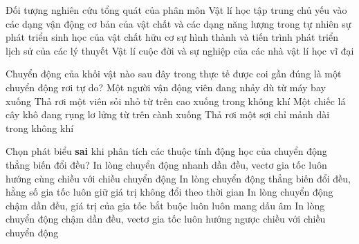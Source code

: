 	\begin{ex}%
		Đối tượng nghiên cứu tổng quát của phân môn Vật lí học tập trung chủ yếu vào
		\choice
		{\True các dạng vận động cơ bản của vật chất và các dạng năng lượng trong tự nhiên}
		{sự phát triển sinh học của vật chất hữu cơ}
		{sự hình thành và tiến trình phát triển lịch sử của các lý thuyết Vật lí}
		{cuộc đời và sự nghiệp của các nhà vật lí học vĩ đại}
	\end{ex}
	
	\begin{ex}%
		Chuyển động của khối vật nào sau đây trong thực tế được coi gần đúng là một chuyển động rơi tự do?
		\choice
		{Một người vận động viên đang nhảy dù từ máy bay xuống}
		{\True Thả rơi một viên sỏi nhỏ từ trên cao xuống trong không khí}
		{Một chiếc lá cây khô đang rụng lơ lửng từ trên cành xuống}
		{Thả rơi một sợi chỉ mảnh dài trong không khí}
	\end{ex}
	
	\begin{ex}%
		Chọn phát biểu \textbf{sai} khi phân tích các thuộc tính động học của chuyển động thẳng biến đổi đều?
		\choice
		{In lòng chuyển động nhanh dần đều, vectơ gia tốc luôn hướng cùng chiều với chiều chuyển động}
		{In lòng chuyển động thẳng biến đổi đều, hằng số gia tốc luôn giữ giá trị không đổi theo thời gian}
		{\True In lòng chuyển động chậm dần đều, giá trị của gia tốc bắt buộc luôn luôn mang dấu âm}
		{In lòng chuyển động chậm dần đều, vectơ gia tốc luôn hướng ngược chiều với chiều chuyển động}
	\end{ex}
	
